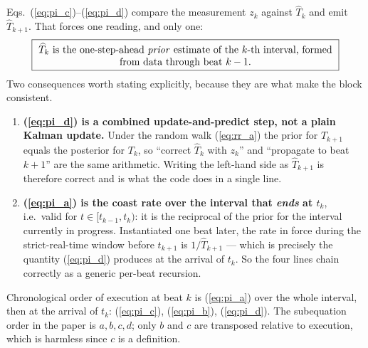 \documentclass[11pt]{article}
\newcommand{\Th}{\widehat{T}}
\begin{document}
Eqs.~(\ref{eq:pi_c})--(\ref{eq:pi_d}) compare the measurement $z_k$ against $\Th_k$ and emit
$\Th_{k+1}$. That forces one reading, and only one:
\begin{equation}
\boxed{\;\parbox{0.86\linewidth}{\centering $\Th_k$ is the one-step-ahead \emph{prior}
estimate of the $k$-th interval, formed from data through beat $k-1$.}\;}
\label{eq:convention}
\end{equation}
Two consequences worth stating explicitly, because they are what make the block consistent.

\begin{enumerate}[leftmargin=1.4em]
\item \textbf{(\ref{eq:pi_d}) is a combined update-and-predict step, not a plain Kalman
update.} Under the random walk (\ref{eq:rr_a}) the prior for $T_{k+1}$ equals the posterior
for $T_k$, so ``correct $\Th_k$ with $z_k$'' and ``propagate to beat $k+1$'' are the same
arithmetic. Writing the left-hand side as $\Th_{k+1}$ is therefore correct and is what the
code does in a single line.

\item \textbf{(\ref{eq:pi_a}) is the coast rate over the interval that \emph{ends} at
$t_k$}, i.e.\ valid for $t\in[t_{k-1},t_k)$: it is the reciprocal of the prior for the
interval currently in progress. Instantiated one beat later, the rate in force during the
strict-real-time window before $t_{k+1}$ is $1/\Th_{k+1}$ --- which is precisely the quantity
(\ref{eq:pi_d}) produces at the arrival of $t_k$. So the four lines chain correctly as a
generic per-beat recursion.
\end{enumerate}

\noindent
Chronological order of execution at beat $k$ is (\ref{eq:pi_a}) over the whole interval, then
at the arrival of $t_k$: (\ref{eq:pi_c}), (\ref{eq:pi_b}), (\ref{eq:pi_d}). The subequation
order in the paper is $a,b,c,d$; only $b$ and $c$ are transposed relative to execution, which
is harmless since $c$ is a definition.
\end{document}
